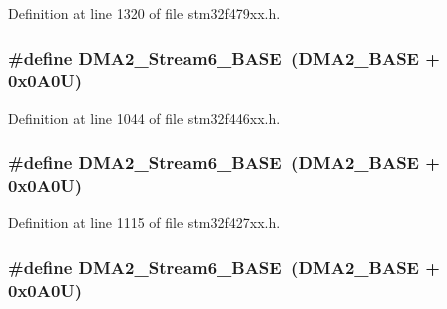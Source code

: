 Definition at line 1320 of file stm32f479xx.\+h.

\subsubsection[{\texorpdfstring{D\+M\+A2\+\_\+\+Stream6\+\_\+\+B\+A\+SE}{DMA2_Stream6_BASE}}]{\setlength{\rightskip}{0pt plus 5cm}\#define D\+M\+A2\+\_\+\+Stream6\+\_\+\+B\+A\+SE~({\bf D\+M\+A2\+\_\+\+B\+A\+SE} + 0x0\+A0\+U)}\hypertarget{group___peripheral__memory__map_ga5e81174c96fd204fa7c82c815e85c8e6}{}\label{group___peripheral__memory__map_ga5e81174c96fd204fa7c82c815e85c8e6}


Definition at line 1044 of file stm32f446xx.\+h.

\subsubsection[{\texorpdfstring{D\+M\+A2\+\_\+\+Stream6\+\_\+\+B\+A\+SE}{DMA2_Stream6_BASE}}]{\setlength{\rightskip}{0pt plus 5cm}\#define D\+M\+A2\+\_\+\+Stream6\+\_\+\+B\+A\+SE~({\bf D\+M\+A2\+\_\+\+B\+A\+SE} + 0x0\+A0\+U)}\hypertarget{group___peripheral__memory__map_ga5e81174c96fd204fa7c82c815e85c8e6}{}\label{group___peripheral__memory__map_ga5e81174c96fd204fa7c82c815e85c8e6}


Definition at line 1115 of file stm32f427xx.\+h.

\subsubsection[{\texorpdfstring{D\+M\+A2\+\_\+\+Stream6\+\_\+\+B\+A\+SE}{DMA2_Stream6_BASE}}]{\setlength{\rightskip}{0pt plus 5cm}\#define D\+M\+A2\+\_\+\+Stream6\+\_\+\+B\+A\+SE~({\bf D\+M\+A2\+\_\+\+B\+A\+SE} + 0x0\+A0\+U)}\hypertarget{group___peripheral__memory__map_ga5e81174c96fd204fa7c82c815e85c8e6}{}\label{group___peripheral__memory__map_ga5e81174c96fd204fa7c82c815e85c8e6}


